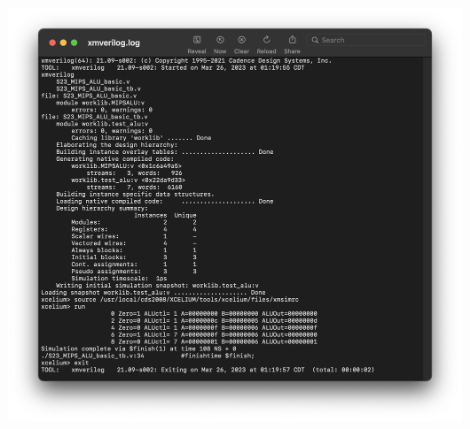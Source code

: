\documentclass[12pt]{article}
\newenvironment{sol}[1][Solution]{\begin{trivlist}\item[\hskip\labelsep {\bfseries #1:}]}{\end{trivlist}}
\begin{document}
\begin{sol}
\begin{center}
        \includegraphics[width=0.9\textwidth]{7.png}
    \end{center}
    \end{sol}
\end{document}
